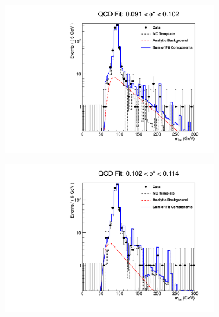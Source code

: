 \begin{figure}[!htbp]
    \centering
    \begin{subfigure}[b]{\SideBySidePlotWidth}
        \includegraphics[width=\linewidth]{figures/qcd_fits/qcd_fit_plot_for_17.pdf}
        \label{fig:qcd_fit_17}
    \end{subfigure}%
    \begin{subfigure}[b]{\SideBySidePlotWidth}
        \includegraphics[width=\linewidth]{figures/qcd_fits/qcd_fit_plot_for_18.pdf}
        \label{fig:qcd_fit_18}
    \end{subfigure}
    \begin{subfigure}[b]{\SideBySidePlotWidth}

\end{subfigure}
\end{figure}
